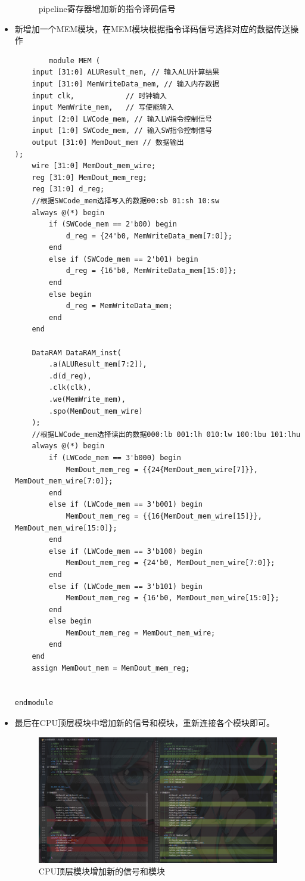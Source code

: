 \documentclass[12pt,hyperref,a4paper,UTF8]{ctexart}
\begin{document}
\begin{itemize}
\begin{figure}[H]
        \caption{pipeline寄存器增加新的指令译码信号}
    \end{figure}
    \item 新增加一个MEM模块，在MEM模块根据指令译码信号选择对应的数据传送操作
    \begin{lstlisting}
        module MEM (
    input [31:0] ALUResult_mem, // 输入ALU计算结果
    input [31:0] MemWriteData_mem, // 输入内存数据
    input clk,            // 时钟输入
    input MemWrite_mem,   // 写使能输入
    input [2:0] LWCode_mem, // 输入LW指令控制信号
    input [1:0] SWCode_mem, // 输入SW指令控制信号
    output [31:0] MemDout_mem // 数据输出
);  
    wire [31:0] MemDout_mem_wire;
    reg [31:0] MemDout_mem_reg;
    reg [31:0] d_reg;
    //根据SWCode_mem选择写入的数据00:sb 01:sh 10:sw
    always @(*) begin
        if (SWCode_mem == 2'b00) begin
            d_reg = {24'b0, MemWriteData_mem[7:0]};
        end
        else if (SWCode_mem == 2'b01) begin
            d_reg = {16'b0, MemWriteData_mem[15:0]};
        end
        else begin
            d_reg = MemWriteData_mem;
        end
    end

    DataRAM DataRAM_inst(
        .a(ALUResult_mem[7:2]),
        .d(d_reg),
        .clk(clk),
        .we(MemWrite_mem),
        .spo(MemDout_mem_wire)
    );
    //根据LWCode_mem选择读出的数据000:lb 001:lh 010:lw 100:lbu 101:lhu
    always @(*) begin
        if (LWCode_mem == 3'b000) begin
            MemDout_mem_reg = {{24{MemDout_mem_wire[7]}}, MemDout_mem_wire[7:0]};
        end
        else if (LWCode_mem == 3'b001) begin
            MemDout_mem_reg = {{16{MemDout_mem_wire[15]}}, MemDout_mem_wire[15:0]};
        end
        else if (LWCode_mem == 3'b100) begin
            MemDout_mem_reg = {24'b0, MemDout_mem_wire[7:0]};
        end
        else if (LWCode_mem == 3'b101) begin
            MemDout_mem_reg = {16'b0, MemDout_mem_wire[15:0]};
        end
        else begin
            MemDout_mem_reg = MemDout_mem_wire;
        end
    end
    assign MemDout_mem = MemDout_mem_reg;


endmodule
    \end{lstlisting}
    \item 最后在CPU顶层模块中增加新的信号和模块，重新连接各个模块即可。
    \begin{figure}[H]
        \centering
        \includegraphics[width=1\textwidth]{figures/fig/image23.png}
        \caption{CPU顶层模块增加新的信号和模块}
    \end{figure}
\end{itemize}
\end{document}
